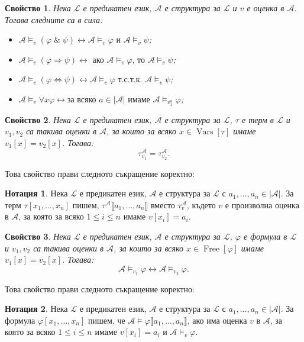 \documentclass[12pt]{article}
\newcommand{\vars}{\operatorname{Vars}}
\newcommand{\free}{\operatorname{Free}}
\newcommand{\logand}{\; \& \;}
\newcommand{\calA}{\mathcal{A}}
\newcommand{\calL}{\mathcal{L}}
\newcommand{\db}[1]{\llbracket #1 \rrbracket}
\newtheorem*{property}{Свойство}
\theoremstyle{definition}
\newtheorem*{notation}{Нотация}
\begin{document}
\begin{property}
	Нека $\calL$ е предикатен език, $\calA$ е структура за $\calL$ и $v$ е оценка в $\calA$.
	Тогава следните са в сила:
	\begin{itemize}
		\item $\calA \models_v (\varphi \logand \psi) \longleftrightarrow \calA \models_v \varphi \text{ и } \calA \models_v \psi$;
		\item $\calA \models_v (\varphi \Rightarrow \psi) \longleftrightarrow \text{ ако }\calA \models_v \varphi \text{, то } \calA \models_v \psi$;
		\item $\calA \models_v (\varphi \Leftrightarrow \psi) \longleftrightarrow \calA \models_v \varphi \text{ т.с.т.к. } \calA \models_v \psi$;
		\item $\calA \models_v \forall x \varphi \longleftrightarrow \text{за всяко } a \in |\calA| \text{ имаме } \calA \models_{v_x^a} \varphi$;
	\end{itemize}
\end{property}

\begin{property}
	Нека $\calL$ е предикатен език, $\calA$ е структура за $\calL$, $\tau$ е терм в $\calL$ и $v_1, v_2$ са такива оценки в $\calA$, за които за всяко $x \in \vars[\tau]$ имаме $v_1[x] = v_2[x]$.
	Тогава:
	\[
		\tau_{v_1}^\calA = \tau_{v_2}^\calA.
	\]
\end{property}

Това свойство прави следното съкращение коректно:
\begin{notation}
	Нека $\calL$ е предикатен език, $\calA$ е структура за $\calL$ с $a_1, \dots, a_n \in |\calA|$.
	За терм $\tau[x_1, \dots, x_n]$ пишем, $\tau^\calA \db{a_1, \dots, a_n}$ вместо $\tau_v^\calA$, където $v$ е произволна оценка в $\calA$, за която за всяко $1 \leq i \leq n$ имаме $v[x_i] = a_i$.
\end{notation}

\begin{property}
	Нека $\calL$ е предикатен език, $\calA$ е структура за $\calL$, $\varphi$ е формула в $\calL$ и $v_1, v_2$ са такива оценки в $\calA$, за които за всяко $x \in \free[\varphi]$ имаме $v_1[x] = v_2[x]$.
	Тогава:
	\[
		\calA \models_{v_1} \varphi \longleftrightarrow \calA \models_{v_2} \varphi.
	\]
\end{property}

\newpage

Това свойство прави следното съкращение коректно:
\begin{notation}
	Нека $\calL$ е предикатен език, $\calA$ е структура за $\calL$ с $a_1, \dots, a_n \in |\calA|$.
	За формула $\varphi[x_1, \dots, x_n]$ пишем, че $\calA \models \varphi \db{a_1, \dots, a_n}$, ако има оценка $v$ в $\calA$, за която за всяко $1 \leq i \leq n$ имаме $v[x_i] = a_i$ и $\calA \models_v \varphi$.
\end{notation}
\end{document}
